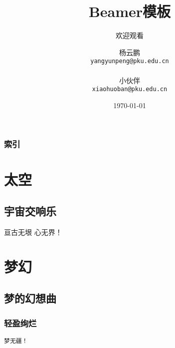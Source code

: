 \documentclass{beamer}
\begin{document}
\title{\textbf{\textcolor[rgb]{0.00,1.00,1.00}{Beamer模板}}}
\subtitle{\textcolor[rgb]{1.00,0.00,0.50}{欢迎观看}}
\subject{Hello, world!}
\author[杨云鹏,小伙伴]{\textcolor[rgb]{1.00,0.00,0.00}{杨云鹏}\\ \texttt{yangyunpeng@pku.edu.cn}
        \\ \text{} \\
        \textcolor[rgb]{1.00,0.00,0.00}{小伙伴}\\ \texttt{xiaohuoban@pku.edu.cn}
        }
\date[,,]{\textcolor[rgb]{0.00,1.00,0.00}{\today}}
\frame{\titlepage}
\begin{frame}
 \frametitle{\textcolor[rgb]{1.00,0.00,1.00}{索引}}
 \tableofcontents%
\end{frame}
\section{太空}
\label{LabelNameCannotBeChinese1}
\subsection{宇宙交响乐}
\label{LabelNameCannotBeChinese2}
\begin{frame}{亘古无垠}
 \textsf{心无界！}
\end{frame}
\section{梦幻}
\label{LabelNameCannotBeChinese3}
\subsection{梦的幻想曲}
\label{LabelNameCannotBeChinese4}
\begin{frame}%
 \frametitle{轻盈绚烂}
 \texttt{梦无疆！}
\end{frame}
\end{document}
